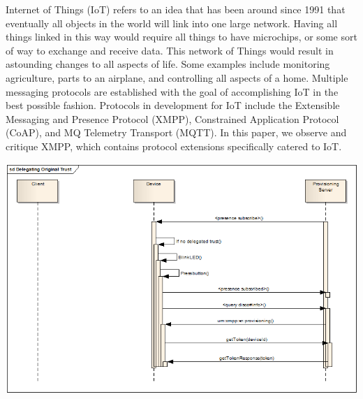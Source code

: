 Internet of Things (IoT) refers to an idea that has been around since
1991\cite{iot_bonanza} that eventually all objects in the world will link into
one large network. Having all things linked in this way would require all
things to have microchips, or some sort of way to exchange and receive data.
This network of Things would result in astounding changes to all aspects of
life. Some examples include monitoring agriculture, parts to an airplane, and
controlling all aspects of a home. Multiple messaging protocols are
established with the goal of accomplishing IoT in the best possible fashion.
Protocols in development for IoT include the Extensible Messaging and Presence
Protocol (XMPP), Constrained Application Protocol (CoAP), and MQ Telemetry
Transport (MQTT)\cite{iot_linkedin}. In this paper, we observe and critique XMPP,
which contains protocol extensions specifically catered to IoT.

\includegraphics[scale=.25]{images/delegatingTrustSimpleNode}

